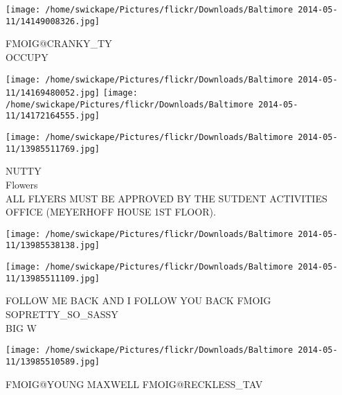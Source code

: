 \documentclass[10pt,letterpaper]{article}
\begin{document}
\vspace{0.25in}
\texttt{[image: /home/swickape/Pictures/flickr/Downloads/Baltimore 2014-05-11/14149008326.jpg]}

FMOIG@CRANKY\_TY\\
OCCUPY\\
\pagebreak

\texttt{[image: /home/swickape/Pictures/flickr/Downloads/Baltimore 2014-05-11/14169480052.jpg]}
\texttt{[image: /home/swickape/Pictures/flickr/Downloads/Baltimore 2014-05-11/14172164555.jpg]}

\texttt{[image: /home/swickape/Pictures/flickr/Downloads/Baltimore 2014-05-11/13985511769.jpg]}

NUTTY\\
Flowers\\
ALL FLYERS MUST BE APPROVED BY THE SUTDENT ACTIVITIES OFFICE (MEYERHOFF HOUSE 1ST FLOOR).\\
\pagebreak

\texttt{[image: /home/swickape/Pictures/flickr/Downloads/Baltimore 2014-05-11/13985538138.jpg]}

\vspace{0.25in}
\texttt{[image: /home/swickape/Pictures/flickr/Downloads/Baltimore 2014-05-11/13985511109.jpg]}

FOLLOW ME BACK AND I FOLLOW YOU BACK FMOIG SOPRETTY\_SO\_SASSY\\
BIG W\\
\pagebreak

\texttt{[image: /home/swickape/Pictures/flickr/Downloads/Baltimore 2014-05-11/13985510589.jpg]}

FMOIG@YOUNG MAXWELL FMOIG@RECKLESS\_TAV\\
\pagebreak
\end{document}

